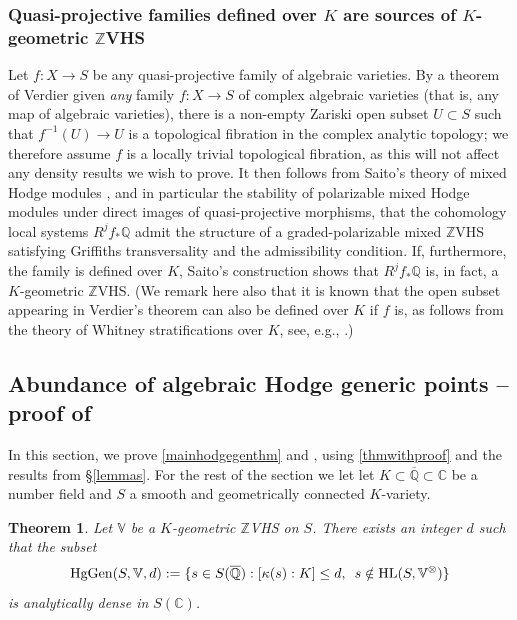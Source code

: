 \documentclass[10pt]{article}
\numberwithin{equation}{section}
\theoremstyle{plain}
\newtheorem{thm}{Theorem}[section]
\theoremstyle{definition}
\theoremstyle{remark}
\newcommand{\HL}{\operatorname{HL}}
\newcommand{\C}{\mathbb{C}}
\newcommand{\Qbar}{\overline{\mathbb{Q}}}
\newcommand{\Q}{\mathbb{Q}}
\newcommand{\Z}{\mathbb{Z}}
\newcommand{\V}{\mathbb{V}}
\begin{document}
\subsubsection{Quasi-projective families defined over $K$ are sources of $K$-geometric $\Z$VHS}
\label{VHSconstrsec}

Let $f: X \to S$ be any quasi-projective family of algebraic varieties. By a theorem of Verdier \cite[Cor. 5.1]{zbMATH03520733} given \emph{any} family $f : X \to S$ of complex algebraic varieties (that is, any map of algebraic varieties), there is a non-empty Zariski open subset $U \subset S$ such that $f^{-1}(U) \to U$ is a topological fibration in the complex analytic topology; we therefore assume $f$ is a locally trivial topological fibration, as this will not affect any density results we wish to prove. It then follows from Saito's theory of mixed Hodge modules \cite{zbMATH04200363}, and in particular the stability of polarizable mixed Hodge modules under direct images of quasi-projective morphisms, that the cohomology local systems $R^{j} f_{*} \mathbb{Q}$ admit the structure of a graded-polarizable mixed $\mathbb{Z}$VHS satisfying Griffiths transversality and the admissibility condition. If, furthermore, the family is defined over $K$, Saito's construction shows that $R^jf_*\Q$ is, in fact, a $K$-geometric $\Z$VHS. (We remark here also that it is known that the open subset appearing in Verdier's theorem can also be defined over $K$ if $f$ is, as follows from the theory of Whitney stratifications over $K$, see, e.g., \cite[Lem. 3.1.9.]{zbMATH06126017}.)

\subsection{Abundance of algebraic Hodge generic points -- proof of }\label{sec6.2}

In this section, we prove \autoref{mainhodgegenthm} and , using \autoref{thmwithproof} and the results from \S \ref{lemmas}. For the rest of the section we let let $K\subset \Qbar \subset \C$ be a number field and $S$ a smooth and geometrically connected $K$-variety.


\begin{thm}
\label{generalHggenthm2}
Let $\V$ be a $K$-geometric $\Z$VHS on $S$. There exists an integer $d$ such that the subset
\[ \operatorname{HgGen}(S,\V,d) := \{ s \in S(\overline{\mathbb{Q}}) : [\kappa(s) : K] \leq d, \hspace{0.5em} s \notin \HL(S, \V^{\otimes}) \} \]
is analytically dense in $S(\mathbb{C})$.
\end{thm}
\end{document}
